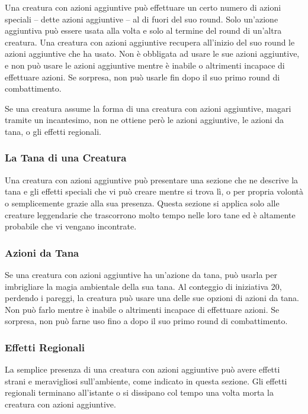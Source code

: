 \begin{multicols}{2}
Una creatura con azioni aggiuntive può effettuare un certo  numero di azioni speciali -- dette azioni aggiuntive -- al  di fuori del suo round. Solo un'azione aggiuntiva può  essere usata alla volta e solo al termine del round di  un'altra creatura. Una creatura con azioni aggiuntive recupera  all'inizio del suo round le azioni aggiuntive che ha  usato. Non è obbligata ad usare le sue azioni aggiuntive, e non può usare le azioni aggiuntive mentre è inabile o altrimenti incapace di effettuare  azioni. Se sorpresa, non può usarle fin dopo il suo  primo round di combattimento.

Se una creatura assume la forma di una creatura con azioni aggiuntive, magari tramite un incantesimo, non ne  ottiene però le azioni aggiuntive, le azioni da tana, o  gli effetti regionali.

\subsubsection{La Tana di una Creatura}

Una creatura con azioni aggiuntive può presentare una sezione che ne descrive la tana e gli effetti speciali che vi può  creare mentre si trova lì, o per propria volontà o  semplicemente grazie alla sua presenza. Questa  sezione si applica solo alle creature leggendarie che  trascorrono molto tempo nelle loro tane ed è altamente  probabile che vi vengano incontrate.

\subsubsection{Azioni da Tana}

Se una creatura con azioni aggiuntive ha un'azione da tana, può  usarla per imbrigliare la magia ambientale della sua  tana. Al conteggio di iniziativa 20, perdendo i pareggi,  la creatura può usare una delle sue opzioni di azioni da  tana. Non può farlo mentre è inabile o altrimenti  incapace di effettuare azioni. Se sorpresa, non può  farne uso fino a dopo il suo primo round di combattimento.

\subsubsection{Effetti Regionali}

La semplice presenza di una creatura con azioni aggiuntive può  avere effetti strani e meravigliosi sull'ambiente, come  indicato in questa sezione. Gli effetti regionali terminano all'istante o si dissipano col tempo una volta  morta la creatura con azioni aggiuntive.

\end{multicols}

